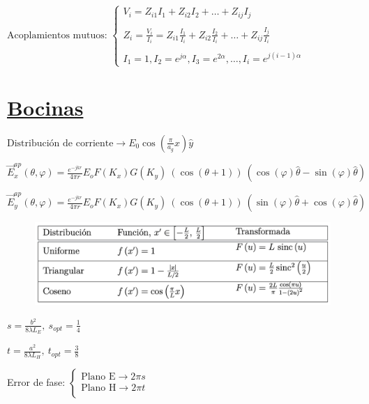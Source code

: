 \documentclass[twocolumn, 8pt]{extarticle}
\begin{document}
\vspace{0.5cm}
\( \text{Acoplamientos mutuos: } \left \{
\begin{array}{l}
	V_i = Z_{i1}I_1 + Z_{i2}I_2 + \dots + Z_{ij}I_j                                                          \\ \\
	Z_i = \frac{V_i}{I_i} = Z_{i1} \frac{I_1}{I_i} + Z_{i2} \frac{I_2}{I_i} + \dots + Z_{ij} \frac{I_j}{I_i} \\ \\
	I_1 = 1, I_2 = e^{j\alpha}, I_3 = e^{2\alpha}, \dots, I_i = e^{j(i-1)\alpha}
\end{array}
\right .
\)

\vspace{0.5cm}
\section*{\underline{Bocinas}}

\( \text{Distribución de corriente} \rightarrow E_0 \cos \left( \frac{\pi}{a_g}x \right) \hat{y} \)

\vspace{0.5cm}
\( \vec{E}_x^{ap}(\theta, \varphi) = \frac{e^{-jkr}}{4\pi r} E_o F(K_x) G(K_y)\ (\cos(\theta + 1))\ (\cos(\varphi) \hat{\theta} -  \sin(\varphi)\hat{\theta}) \)

\vspace{0.5cm}
\( \vec{E}_y^{ap}(\theta, \varphi) = \frac{e^{-jkr}}{4\pi r} E_o F(K_x) G(K_y)\ (\cos(\theta + 1))\ (\sin(\varphi) \hat{\theta} +  \cos(\varphi)\hat{\theta}) \)

\begin{figure}[H]
	\centering
	\includegraphics[width=\columnwidth]{distribuciones.png}
\end{figure}

\( s = \frac{ b^2 }{ 8\lambda L_E}, \ s_{opt} = \frac{1}{4} \)

\vspace{0.5cm}
\( t = \frac{ a^2 }{ 8\lambda L_H}, \ t_{opt} = \frac{3}{8} \)

\vspace{0.5cm}
Error de fase: \( \left \{
\begin{array}{l}
	\text{Plano E} \rightarrow 2\pi s \\
	\text{Plano H} \rightarrow 2\pi t \\
\end{array}
\right . \)
\end{document}
